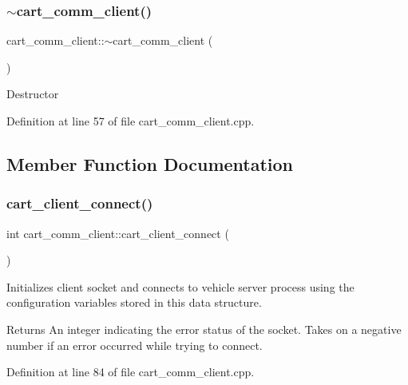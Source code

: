 \subsubsection{\texorpdfstring{$\sim$cart\+\_\+comm\+\_\+client()}{~cart\_comm\_client()}}
{\footnotesize\ttfamily cart\+\_\+comm\+\_\+client\+::$\sim$cart\+\_\+comm\+\_\+client (\begin{DoxyParamCaption}{ }\end{DoxyParamCaption})}

Destructor 

Definition at line 57 of file cart\+\_\+comm\+\_\+client.\+cpp.



\subsection{Member Function Documentation}
\mbox{\label{classcart__comm__client_af1405a30bac4be39a1c37fe8b2f69791}} 
\subsubsection{\texorpdfstring{cart\+\_\+client\+\_\+connect()}{cart\_client\_connect()}}
{\footnotesize\ttfamily int cart\+\_\+comm\+\_\+client\+::cart\+\_\+client\+\_\+connect (\begin{DoxyParamCaption}{ }\end{DoxyParamCaption})}

Initializes client socket and connects to vehicle server process using the configuration variables stored in this data structure. \begin{DoxyReturn}{Returns}
An integer indicating the error status of the socket. Takes on a negative number if an error occurred while trying to connect. 
\end{DoxyReturn}


Definition at line 84 of file cart\+\_\+comm\+\_\+client.\+cpp.

\mbox{\label{classcart__comm__client_aef8aa79120c25ea0f343f20d740b32f2}} 
